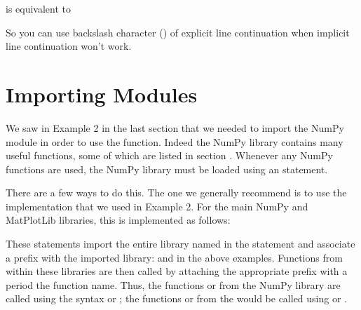 \documentclass[letterpaper,10pt,english]{sphinxmanual}
\begin{document}
\sphinxAtStartPar
is equivalent to

\begin{sphinxVerbatim}[commandchars=\\\{\}]
\end{sphinxVerbatim}

\sphinxAtStartPar
So you can use backslash character (\sphinxcode{\sphinxupquote{\textbackslash{}}}) of explicit line continuation when implicit line continuation won’t work.


\section{Importing Modules}
\label{\detokenize{chap2/chap2_basics:importing-modules}}\label{\detokenize{chap2/chap2_basics:importmods}}
\ignorespaces 
\sphinxAtStartPar
We saw in Example 2 in the last section that we needed to import the NumPy module in order to use the  function.  Indeed the NumPy library contains many useful functions, some of which are listed in section {\hyperref[\detokenize{chap2/chap2_basics:chap2-numpyfuncs}]{}}.  Whenever any NumPy functions are used, the NumPy library must be loaded using an  statement.

\sphinxAtStartPar
There are a few ways to do this.  The one we generally recommend is to use the  implementation that we used in Example 2.  For the main NumPy and MatPlotLib libraries, this is implemented as follows:

\begin{sphinxVerbatim}[commandchars=\\\{\}]
   
   
\end{sphinxVerbatim}

\sphinxAtStartPar
These statements import the entire library named in the  statement and associate a prefix with the imported library:  and  in the above examples.  Functions from within these libraries are then called by attaching the appropriate prefix with a period  the function name.  Thus, the functions  or  from the NumPy library are called using the syntax  or ; the functions  or  from the  would be called using  or .
\end{document}
